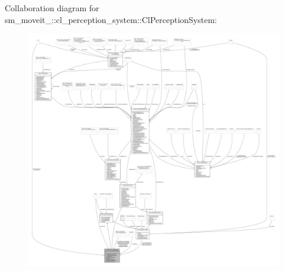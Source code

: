 Collaboration diagram for sm\+\_\+moveit\+\_\+:\+:cl\+\_\+perception\+\_\+system\+:\+:Cl\+Perception\+System\+:
\nopagebreak
\begin{figure}[H]
\begin{center}
\leavevmode
\includegraphics[width=350pt]{classsm__moveit__3_1_1cl__perception__system_1_1ClPerceptionSystem__coll__graph}
\end{center}
\end{figure}
